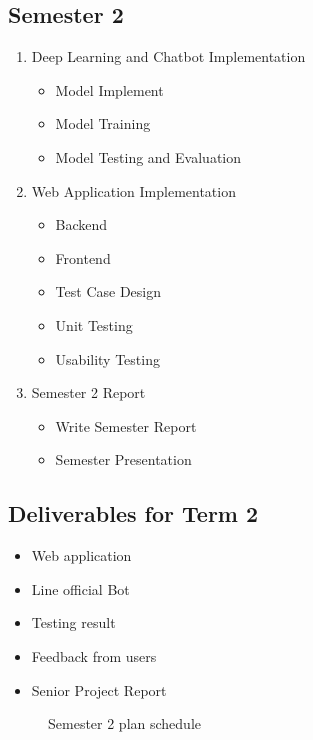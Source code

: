 \documentclass[12pt,oneside,openright,a4paper]{cpe-english-project}
\begin{document}
    \subsection{Semester 2}
      \begin{enumerate}
        \item Deep Learning and Chatbot Implementation
          \begin{itemize}
            \item Model Implement
            \item Model Training
            \item Model Testing and Evaluation
          \end{itemize}
        \item Web Application Implementation
          \begin{itemize}
            \item Backend
            \item Frontend
            \item Test Case Design
            \item Unit Testing
            \item Usability Testing
          \end{itemize}
        \item Semester 2 Report
          \begin{itemize}
            \item Write Semester Report
            \item Semester Presentation
          \end{itemize}
      \end{enumerate}

    \subsection*{Deliverables for Term 2}
      \begin{itemize}
        \item Web application
        \item Line official Bot
        \item Testing result
        \item Feedback from users
        \item Senior Project Report
      \end{itemize}
      \begin{figure}[!h]
        \centering
        \caption{Semester 2 plan schedule}\label{fig:Term2_Gantt}
      \end{figure}
\end{document}
